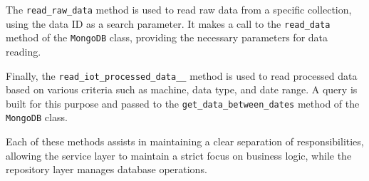 The \texttt{read\_raw\_data} method is used to read raw data from a specific collection, using the data ID as a search parameter. It makes a call to the \texttt{read\_data} method of the \texttt{MongoDB} class, providing the necessary parameters for data reading.

Finally, the \texttt{read\_iot\_processed\_data\_\_} method is used to read processed data based on various criteria such as machine, data type, and date range. A query is built for this purpose and passed to the \texttt{get\_data\_between\_dates} method of the \texttt{MongoDB} class.

Each of these methods assists in maintaining a clear separation of responsibilities, allowing the service layer to maintain a strict focus on business logic, while the repository layer manages database operations.